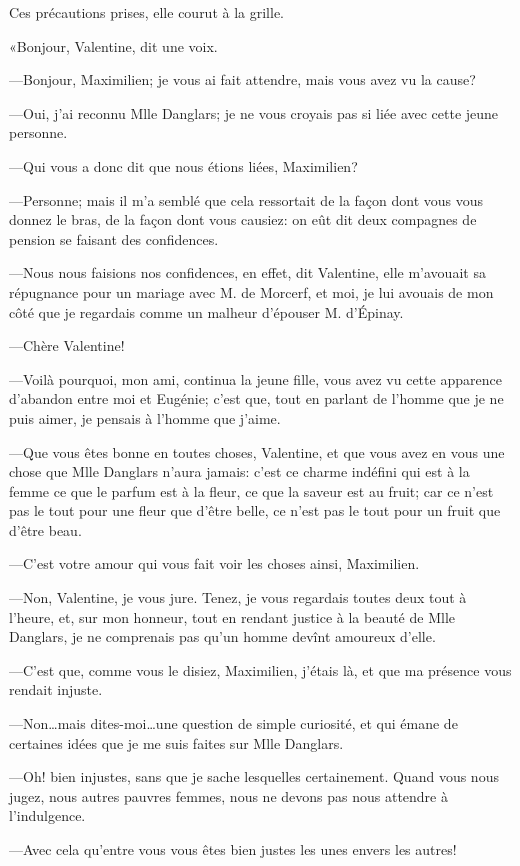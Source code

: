 Ces précautions prises, elle courut à la grille. 

«Bonjour, Valentine, dit une voix. 

—Bonjour, Maximilien; je vous ai fait attendre, mais vous avez vu la cause? 

—Oui, j'ai reconnu Mlle Danglars; je ne vous croyais pas si liée avec cette jeune personne. 

—Qui vous a donc dit que nous étions liées, Maximilien? 

—Personne; mais il m'a semblé que cela ressortait de la façon dont vous vous donnez le bras, de la façon dont vous causiez: on eût dit deux compagnes de pension se faisant des confidences. 

—Nous nous faisions nos confidences, en effet, dit Valentine, elle m'avouait sa répugnance pour un mariage avec M. de Morcerf, et moi, je lui avouais de mon côté que je regardais comme un malheur d'épouser M. d'Épinay. 

—Chère Valentine! 

—Voilà pourquoi, mon ami, continua la jeune fille, vous avez vu cette apparence d'abandon entre moi et Eugénie; c'est que, tout en parlant de l'homme que je ne puis aimer, je pensais à l'homme que j'aime. 

—Que vous êtes bonne en toutes choses, Valentine, et que vous avez en vous une chose que Mlle Danglars n'aura jamais: c'est ce charme indéfini qui est à la femme ce que le parfum est à la fleur, ce que la saveur est au fruit; car ce n'est pas le tout pour une fleur que d'être belle, ce n'est pas le tout pour un fruit que d'être beau. 

—C'est votre amour qui vous fait voir les choses ainsi, Maximilien. 

—Non, Valentine, je vous jure. Tenez, je vous regardais toutes deux tout à l'heure, et, sur mon honneur, tout en rendant justice à la beauté de Mlle Danglars, je ne comprenais pas qu'un homme devînt amoureux d'elle. 

—C'est que, comme vous le disiez, Maximilien, j'étais là, et que ma présence vous rendait injuste. 

—Non\dots mais dites-moi\dots une question de simple curiosité, et qui émane de certaines idées que je me suis faites sur Mlle Danglars. 

—Oh! bien injustes, sans que je sache lesquelles certainement. Quand vous nous jugez, nous autres pauvres femmes, nous ne devons pas nous attendre à l'indulgence. 

—Avec cela qu'entre vous vous êtes bien justes les unes envers les autres! 

